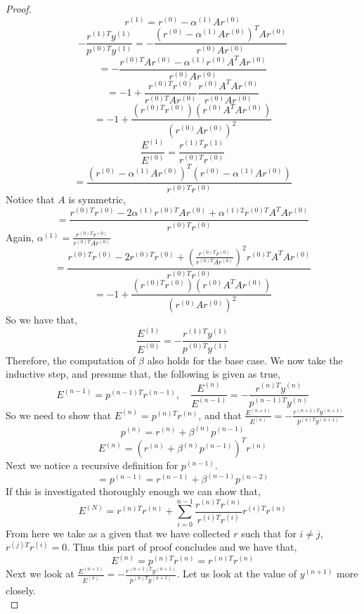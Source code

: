 \documentclass{article}
\begin{document}
\begin{enumerate}
\begin{proof}
\[        \]
        \[
            r^{(1)} = r^{(0)} - \alpha^{(1)}Ar^{(0)}
        \]
        \[
            -\frac{r^{(1)T}y^{(1)}}{p^{(0)T}y^{(1)}} = -\frac{(r^{(0)} - \alpha^{(1)}Ar^{(0)})^TAr^{(0)}}{r^{(0)}Ar^{(0)}} 
        \]
        \[
            = - \frac{r^{(0)T}Ar^{(0)} - \alpha^{(1)}r^{(0)}A^TAr^{(0)}}{r^{(0)}Ar^{(0)}}
        \]
        \[
            = -1 + \frac{r^{(0)T}r^{(0)}}{r^{(0)T}Ar^{(0)}}\frac{r^{(0)}A^TAr^{(0)}}{r^{(0)}Ar^{(0)}}
        \]
        \[
            = -1 + \frac{(r^{(0)T}r^{(0)})(r^{(0)}A^TAr^{(0)})}{(r^{(0)}Ar^{(0)})^2}
        \]
        \[
            \frac{E^{(1)}}{E^{(0)}} = \frac{r^{(1)T}r^{(1)}}{r^{(0)T}r^{(0)}}
        \]
        \[
            = \frac{(r^{(0)} - \alpha^{(1)}Ar^{(0)})^T(r^{(0)} - \alpha^{(1)}Ar^{(0)})}{r^{(0)T}r^{(0)}}
        \]
        Notice that $A$ is symmetric, 
        \[
            = \frac{r^{(0)T}r^{(0)} - 2\alpha^{(1)}r^{(0)T}Ar^{(0)} + \alpha^{(1)2}r^{(0)T}A^TAr^{(0)}}{r^{(0)T}r^{(0)}}
        \]
        Again, $\alpha^{(1)} = \frac{r^{(0)T}r^{(0)}}{r^{(0)T}Ar^{(0)}}$
        \[
            =  \frac{r^{(0)T}r^{(0)} - 2r^{(0)T}r^{(0)} + \left(\frac{r^{(0)T}r^{(0)}}{r^{(0)T}Ar^{(0)}}\right)^2r^{(0)T}A^TAr^{(0)}}{r^{(0)T}r^{(0)}}
        \]
        \[
            = -1 + \frac{(r^{(0)T}r^{(0)})(r^{(0)}A^TAr^{(0)})}{(r^{(0)}Ar^{(0)})^2}
        \]
        So we have that, 
        \[
             \frac{E^{(1)}}{E^{(0)}} = -\frac{r^{(1)T}y^{(1)}}{p^{(0)T}y^{(1)}}
        \]
        Therefore, the computation of $\beta$ also holds for the base case. We now take the inductive step, and presume that, the following is given as true, 
        \[
                E^{(n-1)} = p^{(n-1)T}r^{(n-1)}, \quad \frac{E^{(n)}}{E^{(n-1)}} = -\frac{r^{(n)T}y^{(n)}}{p^{(n-1)T}y^{(n)}}
        \]
        So we need to show that $E^{(n)} = p^{(n)T}r^{(n)}$, and that $\frac{E^{(n+1)}}{E^{(n)}} = -\frac{r^{(n+1)T}y^{(n+1)}}{p^{(n)T}y^{(n+1)}}$
        \[
            p^{(n)} = r^{(n)} + \beta^{(n)}p^{(n-1)}
        \]
        \[
            E^{(n)} = (r^{(n)} + \beta^{(n)}p^{(n-1)})^Tr^{(n)}
        \]
        Next we notice a recursive definition for $p^{(n-1)}$. 
        \[
            = p^{(n-1)} = r^{(n-1)} + \beta^{(n-1)}p^{(n-2)}
        \]
        If this is investigated thoroughly enough we can show that,
        \[
            E^{(N)} = r^{(n)T}r^{(n)} + \sum_{i=0}^{n-1}\frac{r^{(n)T}r^{(n)}}{r^{(i)T}r^{(i)}} r^{(i)T}r^{(n)}
        \]
        From here we take as a given that we have collected $r$ such that for $i\neq j$, $r^{(j)T}r^{(i)} = 0$. Thus this part of proof concludes and we have that, 
        \[
            E^{(n)} = p^{(n)T}r^{(n)} = r^{(n)T}r^{(n)}
        \]
        Next we look at $\frac{E^{(n+1)}}{E^{(n)}} = -\frac{r^{(n+1)T}y^{(n+1)}}{p^{(n)T}y^{(n+1)}}$. Let us look at the value of $y^{(n+1)}$ more closely. 
        \[

\]
\end{proof}
\end{enumerate}
\end{document}
